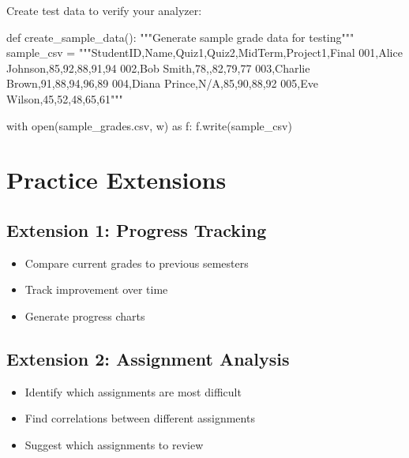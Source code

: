 \documentclass[
  letterpaper,
  DIV=11,
  numbers=noendperiod,
  oneside]{scrreprt}
\newenvironment{Shaded}{}{}
\newcommand{\BuiltInTok}[1]{\textcolor[rgb]{0.84,0.23,0.29}{#1}}
\newcommand{\CommentTok}[1]{\textcolor[rgb]{0.42,0.45,0.49}{#1}}
\newcommand{\ControlFlowTok}[1]{\textcolor[rgb]{0.84,0.23,0.29}{#1}}
\newcommand{\ImportTok}[1]{\textcolor[rgb]{0.01,0.18,0.38}{#1}}
\newcommand{\KeywordTok}[1]{\textcolor[rgb]{0.84,0.23,0.29}{#1}}
\newcommand{\NormalTok}[1]{\textcolor[rgb]{0.14,0.16,0.18}{#1}}
\newcommand{\OperatorTok}[1]{\textcolor[rgb]{0.14,0.16,0.18}{#1}}
\newcommand{\StringTok}[1]{\textcolor[rgb]{0.01,0.18,0.38}{#1}}
\providecommand{\tightlist}{%
  \setlength{\itemsep}{0pt}\setlength{\parskip}{0pt}}\usepackage{longtable,booktabs,array}
\begin{document}
Create test data to verify your analyzer:

\begin{Shaded}
\begin{Highlighting}[]
\KeywordTok{def}\NormalTok{ create\_sample\_data():}
    \CommentTok{"""Generate sample grade data for testing"""}
\NormalTok{    sample\_csv }\OperatorTok{=} \StringTok{"""StudentID,Name,Quiz1,Quiz2,MidTerm,Project1,Final}
\StringTok{001,Alice Johnson,85,92,88,91,94}
\StringTok{002,Bob Smith,78,,82,79,77}
\StringTok{003,Charlie Brown,91,88,94,96,89}
\StringTok{004,Diana Prince,N/A,85,90,88,92}
\StringTok{005,Eve Wilson,45,52,48,65,61"""}
    
    \ControlFlowTok{with} \BuiltInTok{open}\NormalTok{(}\StringTok{\textquotesingle{}sample\_grades.csv\textquotesingle{}}\NormalTok{, }\StringTok{\textquotesingle{}w\textquotesingle{}}\NormalTok{) }\ImportTok{as}\NormalTok{ f:}
\NormalTok{        f.write(sample\_csv)}
\end{Highlighting}
\end{Shaded}

\section{Practice Extensions}\label{practice-extensions}

\subsection{Extension 1: Progress
Tracking}\label{extension-1-progress-tracking}

\begin{itemize}
\tightlist
\item
  Compare current grades to previous semesters
\item
  Track improvement over time
\item
  Generate progress charts
\end{itemize}

\subsection{Extension 2: Assignment
Analysis}\label{extension-2-assignment-analysis}

\begin{itemize}
\tightlist
\item
  Identify which assignments are most difficult
\item
  Find correlations between different assignments
\item
  Suggest which assignments to review
\end{itemize}
\end{document}
